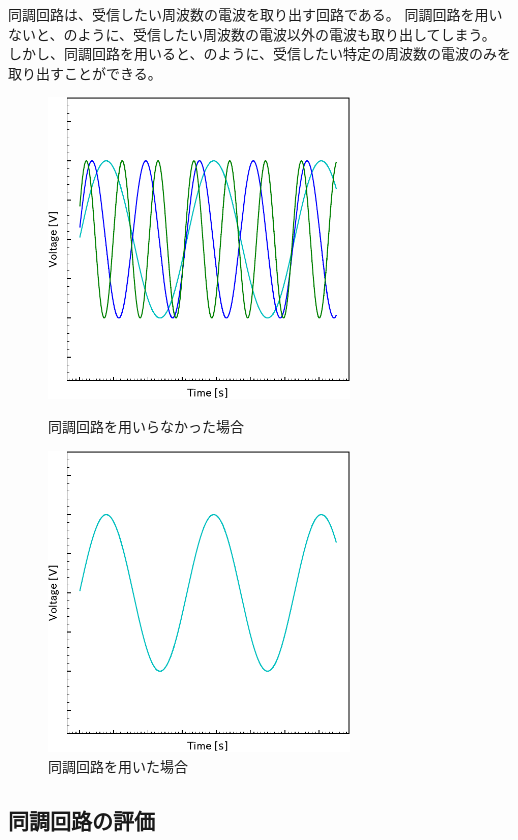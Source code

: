 \documentclass[report.tex]{subfiles}
\begin{document}
同調回路は、受信したい周波数の電波を取り出す回路である。
同調回路を用いないと、のように、受信したい周波数の電波以外の電波も取り出してしまう。
しかし、同調回路を用いると、のように、受信したい特定の周波数の電波のみを取り出すことができる。

\begin{figure}[H]
	\begin{minipage}[b]{0.5\linewidth}
		\centering
		\includegraphics[width=8cm]{fig/diff.pdf}
		\caption{同調回路を用いらなかった場合}
		\label{fig:notuse}
	\end{minipage}
	\begin{minipage}[b]{0.5\linewidth}
		\centering
		\includegraphics[width=8cm]{fig/diff2.pdf}
		\caption{同調回路を用いた場合}
		\label{fig:use}
	\end{minipage}
\end{figure}

\subsection{同調回路の評価}
\end{document}
